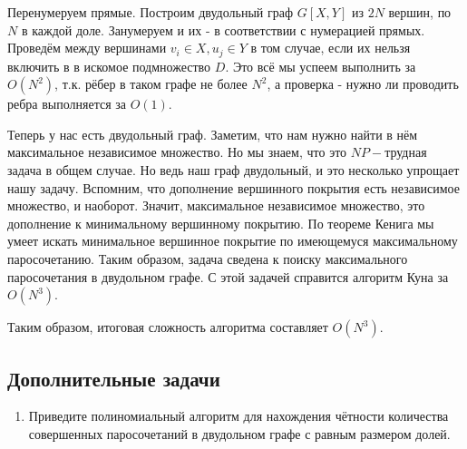 \begin{enumerate}
	Перенумеруем прямые. Построим двудольный граф $G[X,Y]$ из $2N$ вершин, по $N$ в каждой доле. Занумеруем и 
	их - в соответствии с нумерацией прямых. Проведём между вершинами $v_{i} \in X, u_j \in Y$ в том случае, 
	если их нельзя включить в в искомое подмножество $D$. Это всё мы успеем выполнить за $O(N ^ 2)$, т.к. рёбер 
	в таком графе не более $N^2$, а проверка - нужно ли проводить ребра выполняется за $O(1)$. 
	
	Теперь у нас есть двудольный граф. Заметим, что нам нужно найти в нём максимальное независимое множество. 
	Но мы знаем, что это $NP-$трудная задача в общем случае. Но ведь наш граф двудольный, и это несколько 
	упрощает нашу задачу. Вспомним, что дополнение вершинного покрытия есть независимое множество, и наоборот. 
	Значит, максимальное независимое множество, это дополнение к минимальному вершинному покрытию. По теореме 
	Кенига мы умеет искать минимальное вершинное покрытие по имеющемуся максимальному паросочетанию. Таким 
	образом, задача сведена к поиску максимального паросочетания в двудольном графе. С этой задачей справится 
	алгоритм Куна за $O(N^3)$.
	
	Таким образом, итоговая сложность алгоритма составляет $O(N^3)$.
	 
\end{enumerate}

\subsection*{Дополнительные задачи}
\begin{enumerate}
	\item Приведите полиномиальный алгоритм для нахождения чётности количества совершенных паросочетаний в 
	двудольном графе с равным размером долей.
\end{enumerate}